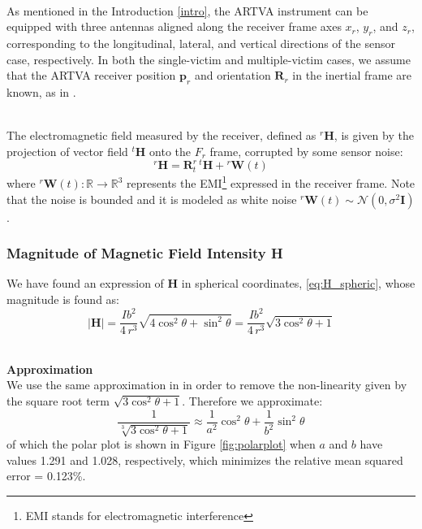 \documentclass[main]{subfiles}
\begin{document}
\noindent\\
As mentioned in the Introduction \ref{intro}, the ARTVA instrument can be equipped with three antennas aligned along 
the receiver frame axes \( x_r \), \( y_r \), and \( z_r \), corresponding to the longitudinal, 
lateral, and vertical directions of the sensor case, respectively. 
In both the single-victim and multiple-victim cases, we assume 
that the ARTVA receiver position \( \mathbf{p}_r \) and orientation \( \mathbf{R}_r \) in 
the inertial frame are known, as in \cite{main}. 

\noindent\\
The electromagnetic field measured by the receiver, defined as  \( {}^r \mathbf{H} \), 
is given by the projection of vector field \( {}^t\mathbf{H} \) onto the \( F_r \) frame, 
corrupted by some sensor noise:
\begin{equation}
    {}^r\mathbf{H} =  \mathbf{R}^r_t \, {}^t\mathbf{H} + {}^r\mathbf{W}(t)
    \label{eq:H_rotated_noise}
\end{equation}
where \( {}^r\mathbf{W}(t) : \mathbb{R} \rightarrow \mathbb{R}^3 \) represents the 
EMI\footnote{EMI stands for electromagnetic interference} 
expressed in the receiver frame. 
Note that the noise is bounded and it is modeled as white noise 
${}^r\mathbf{W}(t) \sim \mathcal{N}(0, \sigma^2 \mathbf{I})$.

\subsubsection{Magnitude of Magnetic Field Intensity H}
We have found an expression of $\mathbf{H}$ in spherical coordinates, \eqref{eq:H_spheric}, whose magnitude is found as:
\begin{equation}
    \left| \mathbf{H} \right| = \frac{I b^2}{4 \, r^3} \sqrt{ 4 \cos^2 \theta + \sin^2 \theta} = \frac{I b^2}{4 \, r^3} \sqrt{ 3 \cos^2 \theta + 1}
    \label{eq:H_mag_spher}
\end{equation}

\noindent\\
\textbf{Approximation}\noindent\\
We use the same approximation in \cite{main} in order to remove the non-linearity given by the square root term $\sqrt{ 3 \cos^2 \theta + 1}$. Therefore we approximate:
\[
\frac{1}{\sqrt[3]{ 3 \cos^2 \theta + 1}} \approx \frac{1}{a^2 }\cos^2 \theta + \frac{1}{b^2} \sin^2 \theta
\]
of which the polar plot is shown in Figure \ref{fig:polarplot} when $a$ and $b$ have values 1.291 and 1.028, 
respectively, which minimizes the relative mean squared error = 0.123\%.
\end{document}
